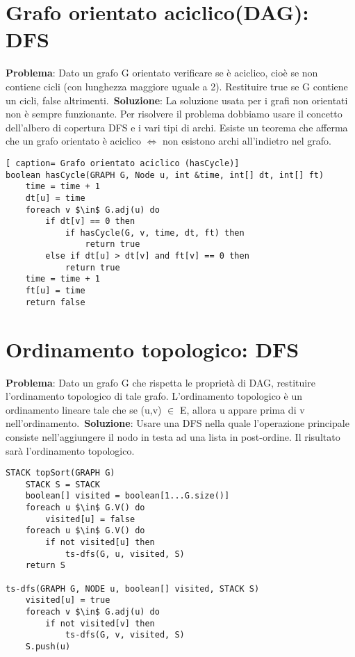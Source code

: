 \documentclass[../cheatSheetAlgoritmi.tex]{subfiles}
\begin{document}
\section{Grafo orientato aciclico(DAG): DFS}
\textbf{Problema}: Dato un grafo G orientato verificare se è aciclico, cioè se non contiene cicli (con lunghezza maggiore uguale a 2). Restituire true se G contiene un cicli, false altrimenti.\
\textbf{Soluzione}: La soluzione usata per i grafi non orientati non è sempre funzionante. Per risolvere il problema dobbiamo usare il concetto dell'albero di copertura DFS e i vari tipi di archi. Esiste un teorema che afferma che un grafo orientato è aciclico $\iff$ non esistono archi all'indietro nel grafo.
\newpage

\begin{lstlisting}[ caption= Grafo orientato aciclico (hasCycle)]
boolean hasCycle(GRAPH G, Node u, int &time, int[] dt, int[] ft)
	time = time + 1
	dt[u] = time
	foreach v $\in$ G.adj(u) do
		if dt[v] == 0 then
			if hasCycle(G, v, time, dt, ft) then
				return true
		else if dt[u] > dt[v] and ft[v] == 0 then
			return true
	time = time + 1
	ft[u] = time
	return false
\end{lstlisting}


\section{Ordinamento topologico: DFS}
\textbf{Problema}: Dato un grafo G che rispetta le proprietà di DAG, restituire l'ordinamento topologico di tale grafo. L'ordinamento topologico è un ordinamento lineare tale che se (u,v) $\in$ E, allora u appare prima di v nell'ordinamento.\
\textbf{Soluzione}: Usare una DFS nella quale l'operazione principale consiste nell'aggiungere il nodo in testa ad una lista in post-ordine. Il risultato sarà l'ordinamento topologico. 
\begin{lstlisting}[caption= Ordinamento topologico]
STACK topSort(GRAPH G)
	STACK S = STACK
	boolean[] visited = boolean[1...G.size()]
	foreach u $\in$ G.V() do 
		visited[u] = false
	foreach u $\in$ G.V() do
		if not visited[u] then
			ts-dfs(G, u, visited, S)
	return S
	
ts-dfs(GRAPH G, NODE u, boolean[] visited, STACK S)
	visited[u] = true
	foreach v $\in$ G.adj(u) do
		if not visited[v] then
			ts-dfs(G, v, visited, S)
	S.push(u)
\end{lstlisting}
\end{document}
